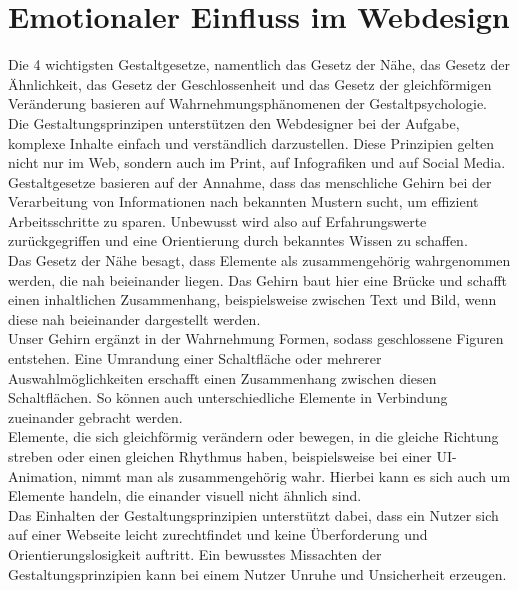 \documentclass[./dokumentation.tex]{subfiles}
\begin{document}
\chapter{Emotionaler Einfluss im Webdesign}
Die 4 wichtigsten Gestaltgesetze, namentlich das Gesetz der Nähe, das Gesetz der Ähnlichkeit, das Gesetz der Geschlossenheit und das Gesetz der gleichförmigen Veränderung basieren auf Wahrnehmungsphänomenen der Gestaltpsychologie.\\


Die Gestaltungsprinzipen unterstützen den Webdesigner bei der Aufgabe, komplexe Inhalte einfach und verständlich darzustellen. Diese Prinzipien gelten nicht nur im Web, sondern auch im Print, auf Infografiken und auf Social Media.\\ 
Gestaltgesetze basieren auf der Annahme, dass das menschliche Gehirn bei der Verarbeitung von Informationen nach bekannten Mustern sucht, um effizient Arbeitsschritte zu sparen. Unbewusst wird also auf Erfahrungswerte zurückgegriffen und eine Orientierung durch bekanntes Wissen zu schaffen. \\

Das Gesetz der Nähe besagt, dass Elemente als zusammengehörig wahrgenommen werden, die nah beieinander liegen. Das Gehirn baut hier eine Brücke und schafft einen inhaltlichen Zusammenhang, beispielsweise zwischen Text und Bild, wenn diese nah beieinander dargestellt werden. \\

Unser Gehirn ergänzt in der Wahrnehmung Formen, sodass geschlossene Figuren entstehen. Eine Umrandung einer Schaltfläche oder mehrerer Auswahlmöglichkeiten erschafft einen Zusammenhang zwischen diesen Schaltflächen. So können auch unterschiedliche Elemente in Verbindung zueinander gebracht werden.\\

Elemente, die sich gleichförmig verändern oder bewegen, in die gleiche Richtung streben oder einen gleichen Rhythmus haben, beispielsweise bei einer UI-Animation, nimmt man als zusammengehörig wahr. Hierbei kann es sich auch um Elemente handeln, die einander visuell nicht ähnlich sind.\\

Das Einhalten der Gestaltungsprinzipien unterstützt dabei, dass ein Nutzer sich auf einer Webseite leicht zurechtfindet und keine Überforderung und Orientierungslosigkeit auftritt. Ein bewusstes Missachten der Gestaltungsprinzipien kann bei einem Nutzer Unruhe und Unsicherheit erzeugen. \\
\end{document}
